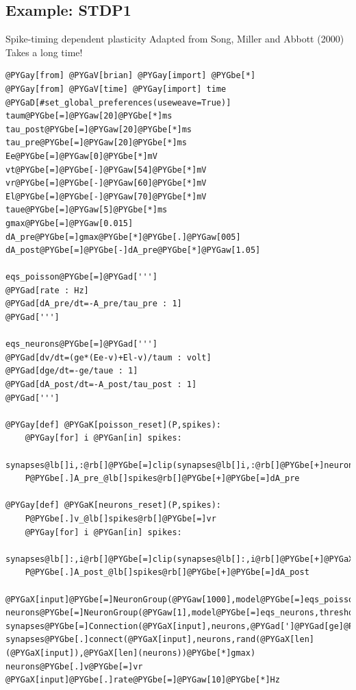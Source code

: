 \documentclass[letterpaper,10pt]{manual}
\begin{document}
\resetcurrentobjects
{}

\hypertarget{index-25}{}\subsection{Example: STDP1}

Spike-timing dependent plasticity
Adapted from Song, Miller and Abbott (2000)
Takes a long time!

\begin{Verbatim}[commandchars=@\[\]]
@PYGay[from] @PYGaV[brian] @PYGay[import] @PYGbe[*]
@PYGay[from] @PYGaV[time] @PYGay[import] time
@PYGaD[#set_global_preferences(useweave=True)]
taum@PYGbe[=]@PYGaw[20]@PYGbe[*]ms
tau_post@PYGbe[=]@PYGaw[20]@PYGbe[*]ms
tau_pre@PYGbe[=]@PYGaw[20]@PYGbe[*]ms
Ee@PYGbe[=]@PYGaw[0]@PYGbe[*]mV
vt@PYGbe[=]@PYGbe[-]@PYGaw[54]@PYGbe[*]mV
vr@PYGbe[=]@PYGbe[-]@PYGaw[60]@PYGbe[*]mV
El@PYGbe[=]@PYGbe[-]@PYGaw[70]@PYGbe[*]mV
taue@PYGbe[=]@PYGaw[5]@PYGbe[*]ms
gmax@PYGbe[=]@PYGaw[0.015]
dA_pre@PYGbe[=]gmax@PYGbe[*]@PYGbe[.]@PYGaw[005]
dA_post@PYGbe[=]@PYGbe[-]dA_pre@PYGbe[*]@PYGaw[1.05]

eqs_poisson@PYGbe[=]@PYGad[''']
@PYGad[rate : Hz]
@PYGad[dA_pre/dt=-A_pre/tau_pre : 1]
@PYGad[''']

eqs_neurons@PYGbe[=]@PYGad[''']
@PYGad[dv/dt=(ge*(Ee-v)+El-v)/taum : volt]
@PYGad[dge/dt=-ge/taue : 1]
@PYGad[dA_post/dt=-A_post/tau_post : 1]
@PYGad[''']

@PYGay[def] @PYGaK[poisson_reset](P,spikes):
    @PYGay[for] i @PYGan[in] spikes:
        synapses@lb[]i,:@rb[]@PYGbe[=]clip(synapses@lb[]i,:@rb[]@PYGbe[+]neurons@PYGbe[.]A_post_,@PYGaw[0],gmax)
    P@PYGbe[.]A_pre_@lb[]spikes@rb[]@PYGbe[+]@PYGbe[=]dA_pre

@PYGay[def] @PYGaK[neurons_reset](P,spikes):
    P@PYGbe[.]v_@lb[]spikes@rb[]@PYGbe[=]vr
    @PYGay[for] i @PYGan[in] spikes:
        synapses@lb[]:,i@rb[]@PYGbe[=]clip(synapses@lb[]:,i@rb[]@PYGbe[+]@PYGaX[input]@PYGbe[.]A_pre_,@PYGaw[0],gmax)
    P@PYGbe[.]A_post_@lb[]spikes@rb[]@PYGbe[+]@PYGbe[=]dA_post

@PYGaX[input]@PYGbe[=]NeuronGroup(@PYGaw[1000],model@PYGbe[=]eqs_poisson,threshold@PYGbe[=]PoissonThreshold(),reset@PYGbe[=]poisson_reset)
neurons@PYGbe[=]NeuronGroup(@PYGaw[1],model@PYGbe[=]eqs_neurons,threshold@PYGbe[=]vt,reset@PYGbe[=]neurons_reset)
synapses@PYGbe[=]Connection(@PYGaX[input],neurons,@PYGad[']@PYGad[ge]@PYGad['],structure@PYGbe[=]@PYGad[']@PYGad[dense]@PYGad['])
synapses@PYGbe[.]connect(@PYGaX[input],neurons,rand(@PYGaX[len](@PYGaX[input]),@PYGaX[len](neurons))@PYGbe[*]gmax)
neurons@PYGbe[.]v@PYGbe[=]vr
@PYGaX[input]@PYGbe[.]rate@PYGbe[=]@PYGaw[10]@PYGbe[*]Hz


\end{Verbatim}
\end{document}

